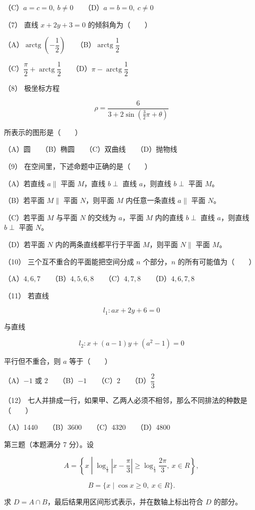\begin{question}
（C）$a=c=0,\ b\ne0$　　（D）$a=b=0,\ c\ne0$

（7） 直线 $x+2y+3=0$ 的倾斜角为\mbox{（　　）}

（A）$\operatorname{arctg}\left(-\dfrac12\right)$　　（B）$\operatorname{arctg}\dfrac12$

（C）$\dfrac\pi2+\operatorname{arctg}\dfrac12$　　（D）$\pi-\operatorname{arctg}\dfrac12$

（8） 极坐标方程

\nopagebreak[4]
\[
\rho=\frac6{3+2\sin\left(\frac32\pi+\theta\right)}
\]

所表示的图形是\mbox{（　　）}

（A）圆　　（B）椭圆　　（C）双曲线　　（D）抛物线

（9） 在空间里，下述命题中正确的是\mbox{（　　）}

（A）若直线 $a\parallel$ 平面 $M$，直线 $b\perp$ 直线 $a$，则直线 $b\perp$ 平面 $M$。

（B）若平面 $M\parallel$ 平面 $N$，则平面 $M$ 内任意一条直线 $a\parallel$ 平面 $N$。

（C）若平面 $M$ 与平面 $N$ 的交线为 $a$，平面 $M$ 内的直线 $b\perp$ 直线 $a$，则直线 $b\perp$ 平面 $N$。

（D）若平面 $N$ 内的两条直线都平行于平面 $M$，则平面 $N\parallel$ 平面 $M$。

（10） 三个互不重合的平面能把空间分成 $n$ 个部分，$n$ 的所有可能值为\mbox{（　　）}

（A）$4,6,7$　　（B）$4,5,6,8$　　（C）$4,7,8$　　（D）$4,6,7,8$

（11） 若直线

\nopagebreak[4]
\[
l_1:ax+2y+6=0
\]

与直线

\nopagebreak[4]
\[
l_2:x+(a-1)y+(a^2-1)=0
\]

平行但不重合，则 $a$ 等于\mbox{（　　）}

（A）$-1$ 或 $2$　　（B）$-1$　　（C）$2$　　（D）$\dfrac23$

（12） 七人并排成一行，如果甲、乙两人必须不相邻，那么不同排法的种数是\mbox{（　　）}

（A）1440　　（B）3600　　（C）4320　　（D）4800

\end{question}
\begin{question}

第三题（本题满分 7 分）。设

\nopagebreak[4]
\[
A=\left\{x\middle|\log_{\frac13}\left|x-\frac\pi3\right|
\geq\log_{\frac13}\frac{2\pi}{3},\ x\in R\right\},
\]

\nopagebreak[4]
\[
B=\{x\mid\cos x\geq0,\ x\in R\}.
\]

求 $D=A\cap B$，最后结果用区间形式表示，并在数轴上标出符合 $D$ 的部分。

\Needspace{0.4\textheight}
\end{question}
